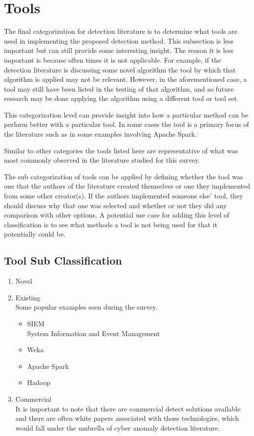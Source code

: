 \section{Tools}
The final categorization for detection literature is to determine what tools are used in implementing the proposed detection method. 
This subsection is less important but can still provide some interesting insight. 
The reason it is less important is because often times it is not applicable. 
For example, if the detection literature is discussing some novel algorithm the tool by which that algorithm is applied may not be relevant. 
However, in the aforementioned case, a tool may still have been listed in the testing of that algorithm, and so future research may be done applying the algorithm using a different tool or tool set.

This categorization level can provide insight into how a particular method can be perform better with a particular tool. 
In some cases the tool is a primary focus of the literature such as in some examples involving Apache Spark.

Similar to other categories the tools listed here are representative of what was most commonly observed in the literature studied for this survey. 

The sub categorization of tools can be applied by defining whether the tool was one that the authors of the literature created themselves or one they implemented from some other creator(s). 
If the authors implemented someone else' tool, they should discuss why that one was selected and whether or not they did any comparison with other options. 
A potential use case for adding this level of classification is to see what methods a tool is not being used for that it potentially could be.

\subsection{Tool Sub Classification}
\begin{enumerate}
    \item Novel
    \item Existing \\
    Some popular examples seen during the survey.
    \begin{itemize}
        \item SIEM \cite{kotenko2012attack}\\
        System Information and Event Management
        \item Weka \cite{asif2011filtering}\cite{thevar2017effect}
        \item Apache Spark \cite{gupta2016framework}\cite{dobson2018performance}
        \item Hadoop \cite{gupta2014big}\cite{tankard2012big}
    \end{itemize}
    \item Commercial \\
    It is important to note that there are commercial detect solutions available and there are often white papers associated with those technologies, which would fall under the umbrella of cyber anomaly detection literature.
\end{enumerate}